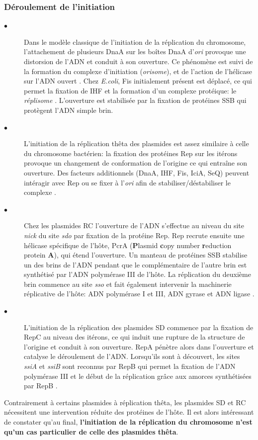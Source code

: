 \subsubsection{Déroulement de l'initiation}
\begin{description} 

\item[$\bullet$] Dans le modèle classique de l'initiation de la réplication du chromosome, l'attachement de plusieurs DnaA sur les boîtes DnaA d'\textit{ori} provoque une distorsion de l'ADN et conduit à son ouverture. Ce phénomène est suivi de la formation du complexe d'initiation (\textit{orisome}), et de l'action de l'hélicase sur l'ADN ouvert \citep{Robinson2005}. Chez \textit{E.coli}, Fis initialement présent est déplacé, ce qui permet la fixation de IHF et la formation d'un complexe protéique: le \textit{réplisome}  \citep{Mott2007,zakrzewska2007regulation}. L'ouverture est stabilisée par la fixation de protéines SSB qui protègent l'ADN simple brin.
\item[$\bullet$] L'initiation de la réplication thêta des plasmides est assez similaire à celle du chromosome bactérien: la fixation des protéines Rep sur les itérons provoque un changement de conformation de l'origine ce qui entraîne son ouverture. Des facteurs additionnels (DnaA, IHF, Fis, IciA, SeQ)  peuvent intéragir avec Rep ou se fixer à l'\textit{ori} afin de stabiliser/déstabiliser le complexe \citep{Kruger2004}.  
\item[$\bullet$] Chez les plasmides RC l'ouverture de l'ADN s'effectue au niveau du site \textit{nick} du site \textit{sdo} par fixation de la protéine Rep. Rep recrute ensuite une hélicase spécifique de l'hôte, PcrA (\textbf{P}lasmid \textbf{c}opy number \textbf{r}eduction protein \textbf{A}), qui étend l'ouverture. Un manteau de protéines SSB stabilise un des brins de l'ADN pendant que le complémentaire de l'autre brin est synthétisé par l'ADN polymérase III de l'hôte. La réplication du deuxième brin commence au site \textit{sso} et fait également intervenir la machinerie réplicative de l'hôte: ADN polymérase I et III, ADN gyrase et ADN ligase \citep{khan2005plasmid}.
\item[$\bullet$] L'initiation de la réplication des plasmides SD commence par la fixation de RepC au niveau des itérons, ce qui induit une rupture de la structure de l'origine et conduit à son ouverture. RepA pénètre alors dans l'ouverture et catalyse le déroulement de l'ADN. Lorsqu'ils sont à découvert, les sites \textit{ssiA} et \textit{ssiB} sont reconnus par RepB qui permet la fixation de l'ADN polymérase III et le début de la réplication grâce aux amorces synthétisées par RepB \citep{Loftie-Eaton2012}.
\end{description}
Contrairement à certains plasmides à réplication thêta, les plasmides SD et RC nécessitent une intervention réduite des protéines de l'hôte. Il est alors intéressant de constater qu'au final, \textbf{\color{orange} l'initiation de la réplication du chromosome n'est qu'un cas particulier de celle des plasmides thêta}.


